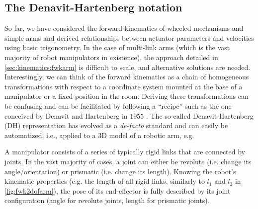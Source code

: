 \subsection{The Denavit-Hartenberg notation}\label{sec:kinematics:dh}

So far, we have considered the forward kinematics of wheeled mechanisms and simple arms and derived relationships between actuator parameters and velocities using basic trigonometry.
In the case of multi-link arms (which is the vast majority of robot manipulators in existence), the approach detailed in \cref{sec:kinematics:fwkarm} is difficult to scale, and alternative solutions are needed.
Interestingly, we can think of the forward kinematics as a chain of homogeneous transformations with respect to a coordinate system mounted at the base of a manipulator or a fixed position in the room.
Deriving these transformations can be confusing and can be facilitated by following a ``recipe'' such as the one conceived by Denavit and Hartenberg in $1955$ .
The so-called Denavit-Hartenberg (DH) representation has evolved as a \textsl{de-facto} standard and can easily be automatized, i.e., applied to a 3D model of a robotic arm, e.g. 

A manipulator consists of a series of typically rigid links that are connected by joints.
In the vast majority of cases, a joint can either be revolute (i.e. change its angle/orientation) or prismatic (i.e. change its length).
Knowing the robot's kinematic properties (e.g. the length of all rigid links, similarly to $l_1$ and $l_2$ in \cref{fig:fwk2dofarm}), the pose of its end-effector is fully described by its joint configuration (angle for revolute joints, length for prismatic joints).



